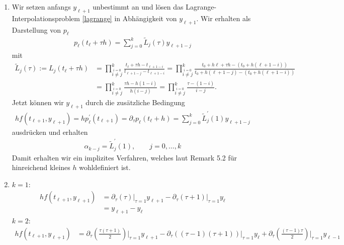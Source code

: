 \begin{solution}
\begin{enumerate}[label = \textbf{\alph*)}]
  \item Wir setzen anfangs $y_{\ell + 1}$ unbestimmt an und lösen das Lagrange-Interpolationsproblem
  \eqref{lagrange} in Abhängigkeit von $y_{\ell + 1}$.
  Wir erhalten als Darstellung von $p_{\ell}$
  \begin{align*}
    p_{\ell}(t_{\ell} + \tau h) = \sum_{j=0}^k\tilde{L}_j(\tau)y_{\ell + 1 - j}
  \end{align*}
  mit
  \begin{align*}
    \tilde{L}_j(\tau) := L_j(t_{\ell} + \tau h) &= \prod_{\stackrel{i = 0}{i \neq j}}^{k}\frac{t_{\ell} + \tau h - t_{\ell + 1 - i}}{t_{\ell + 1 -j} - t_{\ell + 1 - i}}
    = \prod_{\stackrel{i = 0}{i \neq j}}^{k}\frac{t_0 + h{\ell} + \tau h - (t_0 + h(\ell + 1 - i))}{t_0 + h(\ell + 1 -j) - (t_0
    + h(\ell + 1 - i))} \\
    &=  \prod_{\stackrel{i = 0}{i \neq j}}^{k}\frac{\tau h - h(1 - i)}{h(i - j)}
    = \prod_{\stackrel{i = 0}{i \neq j}}^{k}\frac{\tau  - (1 - i)}{i - j}.
  \end{align*}
  Jetzt können wir $y_{\ell + 1}$ durch die zusätzliche Bedingung
  \begin{align*}
    hf(t_{\ell + 1},y_{\ell + 1}) = hp_{\ell}^{\prime}(t_{\ell + 1}) = \partial_{\tau}p_{\ell}(t_{\ell} + h) =
    \sum_{j=0}^k\tilde{L}_j^{\prime}(1)y_{\ell + 1 - j}
  \end{align*}
  ausdrücken und erhalten
  \begin{align*}
    \alpha_{k - j} = \tilde{L}_j^{\prime}(1), \qquad j = 0,\dots,k
  \end{align*}
  Damit erhalten wir ein implizites Verfahren, welches laut Remark 5.2 für
  hinreichend kleines $h$ wohldefiniert ist.
  \item $k = 1$:
  \begin{align*}
    hf(t_{\ell + 1},y_{\ell + 1}) &= \partial_{\tau}(\tau)\Bigg|_{\tau = 1}y_{\ell + 1} -
    \partial_{\tau}(\tau + 1)\Bigg|_{\tau = 1}y_{\ell} \\
    &= y_{\ell + 1} - y_{\ell}
  \end{align*}
  $k = 2$:
  \begin{align*}
  hf(t_{\ell + 1},y_{\ell + 1}) &= \partial_{\tau}\left(\frac{\tau(\tau + 1)}{2}\right)
  \Bigg|_{\tau = 1}y_{\ell + 1} -
  \partial_{\tau}\left((\tau - 1)(\tau + 1)\right)
  \Bigg|_{\tau = 1}y_{\ell} +
  \partial_{\tau}\left(\frac{(\tau - 1)\tau}{2}\right)
  \Bigg|_{\tau = 1}y_{\ell - 1} \\

\end{align*}
\end{enumerate}
\end{solution}
